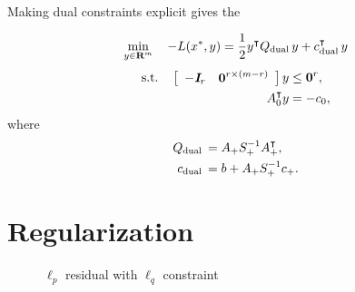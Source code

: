 \documentclass{article}
\begin{document}
    Making dual constraints explicit gives the \QP

    \begin{align}
        \min_{y\in\textbf{R}^m}\quad -L(x^*,y)=\frac{1}{2} y^\intercal Q_{\text{dual}\:} y + c_{\text{dual}\:}^\intercal y 
    \end{align}
    \begin{align*}
        \text{s.t.}\quad  \left[\begin{array}{lllllllllllllllllll}-\emph{\textbf{I}}_{r}&\textbf{0}^{{r}\times (m-{r})}\end{array}\right]y&\leq \textbf{0}^{r},\\
        A_0^\intercal y&=-c_0,
    \end{align*}
    where
    \begin{align*}
        Q_{\text{dual}\:}&=A_+ S_+^{-1} A_+^\intercal,\\
        c_{\text{dual}\:}&=b+A_+ S_+^{-1} c_+.
    \end{align*}

\clearpage

\section{Regularization}

    \begin{figure}[h!]
        \centering
        \qquad
        \qquad
        \caption{$\ell_p$ residual with $\ell_q$ constraint}%
        \label{fig:lasso}%
    \end{figure}
\end{document}
